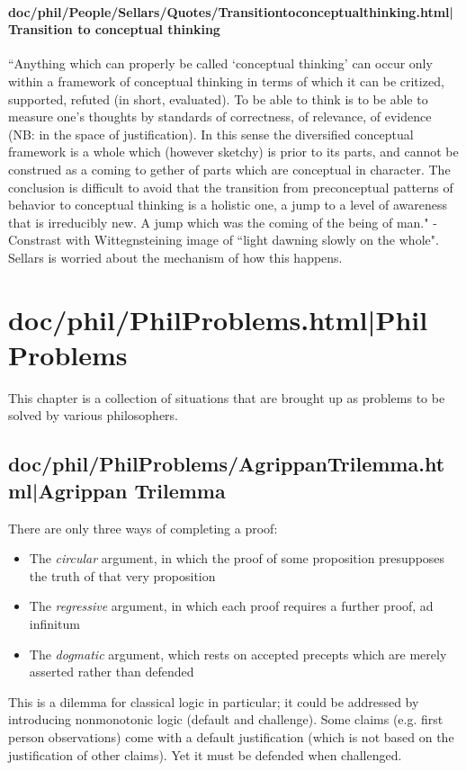 \documentclass[12pt,a4paper]{report}
\begin{document}
\subsection{doc/phil/People/Sellars/Quotes/Transitiontoconceptualthinking.html|Transition to conceptual thinking}
``Anything which can properly be called `conceptual thinking' can occur only within a framework of conceptual thinking in terms of which it can be critized, supported, refuted (in short, evaluated). To be able to think is to be able to measure one's thoughts by standards of correctness, of relevance, of evidence (NB: in the space of justification). In this sense the diversified conceptual framework is a whole which (however sketchy) is prior to its parts, and cannot be construed as a coming to gether of parts which are conceptual in character. The conclusion is difficult to avoid that the transition from preconceptual patterns of behavior to conceptual thinking is a holistic one, a jump to a level of awareness that is irreducibly new. A jump which was the coming of the being of man." - Constrast with Wittegnsteining image of ``light dawning slowly on the whole". Sellars is worried about the mechanism of how this happens.

\part{doc/phil/PhilProblems.html|Phil Problems}
This chapter is a collection of situations that are brought up as problems to be solved by various philosophers.

\chapter{doc/phil/PhilProblems/AgrippanTrilemma.html|Agrippan Trilemma}
There are only three ways of completing a proof:
\begin{itemize}
    \item The \emph{circular} argument, in which the proof of some proposition presupposes the truth of that very proposition
    \item The \emph{regressive} argument, in which each proof requires a further proof, ad infinitum
    \item The \emph{dogmatic} argument, which rests on accepted precepts which are merely asserted rather than defended
\end{itemize}

This is a dilemma for classical logic in particular; it could be addressed by introducing nonmonotonic logic (default and challenge). Some claims (e.g. first person observations) come with a default justification (which is not based on the justification of other claims). Yet it must be defended when challenged.
\end{document}
